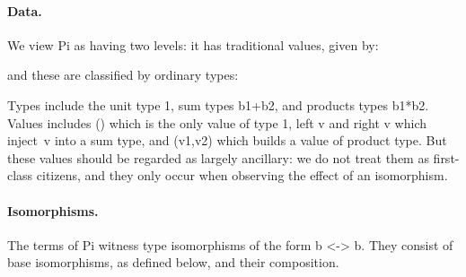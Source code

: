 \documentclass{llncs}
\newcommand{\roshan}[1]{}
\begin{document}
\roshan{The use of the word ``orthogonal'' is inappropriate in the
  footnote. Adding 0 truly affects how fractionals are developed,
  whereas when we say ``orthogonal'' we give the impression that it does
  not really matter. }

\paragraph*{Data.}
We view {{Pi}} as having two levels:  it has traditional values, given by:

\noindent and these are classified by ordinary types:

\noindent 
Types include the unit type {{1}}, sum types {{b1+b2}}, and
products types {{b1*b2}}.  Values includes {{()}} which is the only value of
type {{1}}, {{left v}} and {{right v}} which inject~{{v}} into a sum type,
and {{(v1,v2)}} which builds a value of product type. But these values should
be regarded as largely ancillary: we do not treat them as first-class citizens,
and they only occur when observing the effect of an isomorphism.

\roshan{It is unclear what the usage ``first-class'' and ``effect of
  an isomorphism'' indicate. Maybe we should rephrase. }


\paragraph*{Isomorphisms.} The terms of {{Pi}} witness
type isomorphisms of the form {{b <-> b}}. They consist of base
isomorphisms, as defined below, and their composition.
\end{document}
